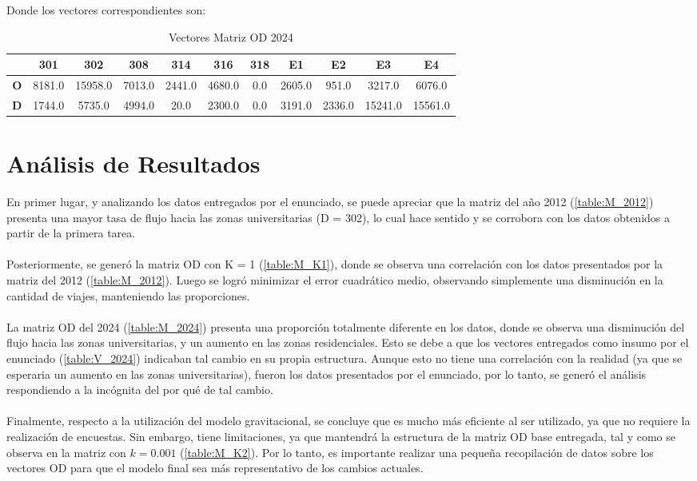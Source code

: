 \documentclass[12pt]{article} %
\begin{document}
Donde los vectores correspondientes son:

\begin{table}[H]
  \centering
  \footnotesize
  \begin{tabular}{c|cccccccccc}    
  \textbf{} & \textbf{301} & \textbf{302} & \textbf{308} & \textbf{314} & \textbf{316} & \textbf{318} & \textbf{E1} & \textbf{E2} & \textbf{E3} & \textbf{E4} \\ \hline
  \textbf{O} & 8181.0 & 15958.0 & 7013.0 & 2441.0 & 4680.0 & 0.0 & 2605.0 & 951.0 & 3217.0 & 6076.0 \\ 
  \textbf{D} & 1744.0 & 5735.0 & 4994.0 & 20.0 & 2300.0 & 0.0 & 3191.0 & 2336.0 & 15241.0 & 15561.0 \\ 
  \end{tabular}
  \caption{Vectores Matriz OD 2024}
  \label{table:data_matrix}
\end{table}

\newpage
\section{Análisis de Resultados}

En primer lugar, y analizando los datos entregados por el enunciado, se puede apreciar que la matriz del año 2012 (\ref{table:M_2012}) presenta una mayor tasa de flujo hacia las zonas universitarias (D = 302), lo cual hace sentido y se corrobora con los datos obtenidos a partir de la primera tarea.
\\ \\
Posteriormente, se generó la matriz OD con K = 1 (\ref{table:M_K1}), donde se observa una correlación con los datos presentados por la matriz del 2012 (\ref{table:M_2012}). Luego se logró minimizar el error cuadrático medio, observando simplemente una disminución en la cantidad de viajes, manteniendo las proporciones.
\\ \\
La matriz OD del 2024 (\ref{table:M_2024}) presenta una proporción totalmente diferente en los datos, 
donde se observa una disminución del flujo hacia las zonas universitarias, y un aumento en las zonas residenciales. 
Esto se debe a que los vectores entregados como insumo por el enunciado (\ref{table:V_2024}) 
indicaban tal cambio en su propia estructura. Aunque esto no tiene una correlación con la realidad 
(ya que se esperaria un aumento en las zonas universitarias), fueron los datos presentados por el enunciado, por lo tanto, se generó el análisis respondiendo a la incógnita del por qué de tal cambio.
\\ \\
Finalmente, respecto a la utilización del modelo gravitacional, se concluye que es mucho más eficiente al ser utilizado, ya que no requiere la realización de encuestas. Sin embargo, tiene limitaciones, ya que mantendrá la estructura de la matriz OD base entregada, tal y como se observa en la matriz con \(k = 0.001\) (\ref{table:M_K2}). Por lo tanto, es importante realizar una pequeña recopilación de datos sobre los vectores OD para que el modelo final sea más representativo de los cambios actuales.
\end{document}
